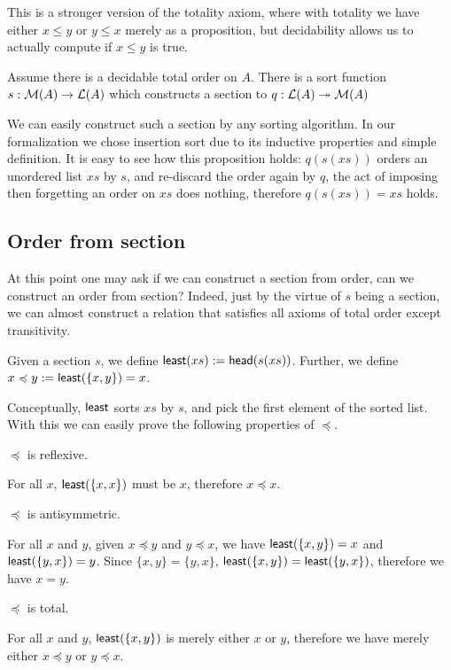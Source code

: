 This is a stronger version of the totality axiom, where with totality we have 
either $x \leq y$ or $y \leq x$ merely as a proposition, but decidability allows us to actually
compute if $x \leq y$ is true.

\begin{proposition}
Assume there is a decidable total order on $A$. There is a sort function $s: \mathcal{M}(A) \to \mathcal{L}(A)$
which constructs a section to $q : \mathcal{L}(A) \twoheadrightarrow \mathcal{M}(A)$
\end{proposition}

We can easily construct such a section by any sorting algorithm. In our formalization we chose
insertion sort due to its inductive properties and simple definition. It is easy to see how this
proposition holds: $q(s(xs))$ orders an unordered list $xs$ by $s$, and re-discard the order again by
$q$, the act of imposing then forgetting an order on $xs$ does nothing, therefore $q(s(xs)) = xs$ holds.

\subsection{Order from section}
At this point one may ask if we can construct a section from order, can we construct an order from section?
Indeed, just by the virtue of $s$ being a section, we can almost construct a relation that satisfies
all axioms of total order except transitivity. 

\begin{definition}
Given a section $s$, we define $\operatorname{\mathsf{least}}(xs) := \operatorname{\mathsf{head}}(s(xs))$.
Further, we define $x \preccurlyeq y := \operatorname{\mathsf{least}}(\{x, y\}) = x$. 
\end{definition}

Conceptually, $\operatorname{\mathsf{least}}$ sorts $xs$ by $s$, and pick the first element of the sorted list.
With this we can easily prove the following properties of $\preccurlyeq$.

\begin{theorem}
$\preccurlyeq$ is reflexive.
\end{theorem}
For all $x$, $\operatorname{\mathsf{least}}(\{x, x\})$ must be $x$, therefore $x \preccurlyeq x$.

\begin{theorem}
$\preccurlyeq$ is antisymmetric.
\end{theorem}
For all $x$ and $y$, given $x \preccurlyeq y$ and $y \preccurlyeq x$,
we have $\operatorname{\mathsf{least}}(\{x, y\}) = x$ and $\operatorname{\mathsf{least}}(\{y, x\}) = y$.
Since $\{x, y\} = \{y, x\}$, $\operatorname{\mathsf{least}}(\{x, y\}) = \operatorname{\mathsf{least}}(\{y, x\})$,
therefore we have $x = y$.

\begin{theorem}
$\preccurlyeq$ is total.
\end{theorem}
For all $x$ and $y$, $\operatorname{\mathsf{least}}(\{x, y\})$ is merely either $x$ or $y$,
therefore we have merely either $x \preccurlyeq y$ or $y \preccurlyeq x$.


